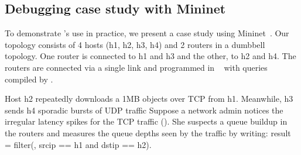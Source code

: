 
\subsection{Debugging case study with Mininet}
\label{s:eval:mininet}
\label{sec:eval:mininet}

To demonstrate \TheSystem's use in practice, we present a case study using
Mininet~\cite{mininet}.
Our topology consists of 4 hosts ({\ct h1, h2, h3, h4}) and 2 routers in a dumbbell topology.
One router is connected to {\ct h1} and {\ct h3}
and the other, to {\ct h2} and {\ct h4}.
The routers are connected via a single link and
programmed in \pfs~\cite{p4-bmv2} with queries compiled by \TheSystem.

Host {\ct h2} repeatedly downloads a 1MB objects over TCP from {\ct h1}.
Meanwhile, {\ct h3} sends {\ct h4} sporadic bursts of UDP traffic %
Suppose a network admin notices the irregular latency
spikes for the TCP traffic (). She suspects a queue buildup
in the routers and measures the queue depths seen by the traffic by writing:
{\ct result = filter(\pktlog, srcip == h1 and dstip == h2).}



